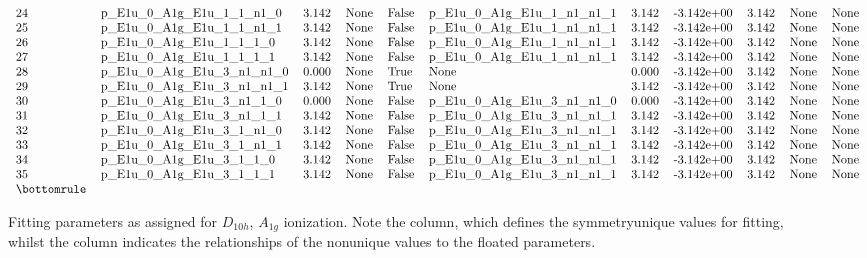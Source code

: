 \documentclass[letterpaper,table,10pt,english]{jupyterBook}
\begin{document}
\begin{figure}[htbp]
\begin{equation*}
\begin{split}
\begin{tabular}{llrlllrrrll}
24 &   p\_E1u\_0\_A1g\_E1u\_1\_1\_n1\_0 &  3.142 &   None &  False &  p\_E1u\_0\_A1g\_E1u\_1\_n1\_n1\_1 &       3.142 & -3.142e+00 &  3.142 &       None &   None \\
25 &   p\_E1u\_0\_A1g\_E1u\_1\_1\_n1\_1 &  3.142 &   None &  False &  p\_E1u\_0\_A1g\_E1u\_1\_n1\_n1\_1 &       3.142 & -3.142e+00 &  3.142 &       None &   None \\
26 &    p\_E1u\_0\_A1g\_E1u\_1\_1\_1\_0 &  3.142 &   None &  False &  p\_E1u\_0\_A1g\_E1u\_1\_n1\_n1\_1 &       3.142 & -3.142e+00 &  3.142 &       None &   None \\
27 &    p\_E1u\_0\_A1g\_E1u\_1\_1\_1\_1 &  3.142 &   None &  False &  p\_E1u\_0\_A1g\_E1u\_1\_n1\_n1\_1 &       3.142 & -3.142e+00 &  3.142 &       None &   None \\
28 &  p\_E1u\_0\_A1g\_E1u\_3\_n1\_n1\_0 &  0.000 &   None &   True &                       None &       0.000 & -3.142e+00 &  3.142 &       None &   None \\
29 &  p\_E1u\_0\_A1g\_E1u\_3\_n1\_n1\_1 &  3.142 &   None &   True &                       None &       3.142 & -3.142e+00 &  3.142 &       None &   None \\
30 &   p\_E1u\_0\_A1g\_E1u\_3\_n1\_1\_0 &  0.000 &   None &  False &  p\_E1u\_0\_A1g\_E1u\_3\_n1\_n1\_0 &       0.000 & -3.142e+00 &  3.142 &       None &   None \\
31 &   p\_E1u\_0\_A1g\_E1u\_3\_n1\_1\_1 &  3.142 &   None &  False &  p\_E1u\_0\_A1g\_E1u\_3\_n1\_n1\_1 &       3.142 & -3.142e+00 &  3.142 &       None &   None \\
32 &   p\_E1u\_0\_A1g\_E1u\_3\_1\_n1\_0 &  3.142 &   None &  False &  p\_E1u\_0\_A1g\_E1u\_3\_n1\_n1\_1 &       3.142 & -3.142e+00 &  3.142 &       None &   None \\
33 &   p\_E1u\_0\_A1g\_E1u\_3\_1\_n1\_1 &  3.142 &   None &  False &  p\_E1u\_0\_A1g\_E1u\_3\_n1\_n1\_1 &       3.142 & -3.142e+00 &  3.142 &       None &   None \\
34 &    p\_E1u\_0\_A1g\_E1u\_3\_1\_1\_0 &  3.142 &   None &  False &  p\_E1u\_0\_A1g\_E1u\_3\_n1\_n1\_1 &       3.142 & -3.142e+00 &  3.142 &       None &   None \\
35 &    p\_E1u\_0\_A1g\_E1u\_3\_1\_1\_1 &  3.142 &   None &  False &  p\_E1u\_0\_A1g\_E1u\_3\_n1\_n1\_1 &       3.142 & -3.142e+00 &  3.142 &       None &   None \\
\bottomrule
\end{tabular}\end{split}
\end{equation*}\caption{Fitting parameters as assigned for \(D_{10h}\), \(A_{1g}\) ionization. Note the  column, which defines the symmetry\sphinxhyphen{}unique values for fitting, whilst the  column indicates the relationships of the non\sphinxhyphen{}unique values to the floated parameters.}\label{\detokenize{part2/sym-fitting-intro_240723:fig-fittingparamsd10ha1g}}\end{figure}
\end{document}
